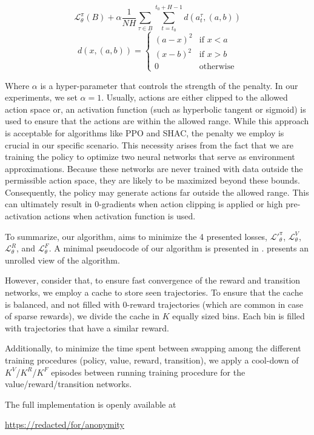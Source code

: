 $$\mathcal{L}_\theta^\pi(B) + \alpha \frac{1}{NH}\sum_{\tau\in B}\sum_{t=t_0}^{t_0+H-1} d(a_t^\tau,(a,b))$$
$$d(x,(a,b)) = \begin{cases}(a-x)^2 & \text{if } x < a \\ (x-b)^2 & \text{if } x > b \\ 0 & \text{otherwise} \end{cases}$$

    Where $\alpha$ is a hyper-parameter that controls the strength of the penalty. In our experiments, we set $\alpha=1$. Usually, actions are either clipped to the allowed action space or, an activation function (such as hyperbolic tangent or sigmoid) is used to ensure that the actions are within the allowed range. While this approach is acceptable for algorithms like PPO and SHAC, the penalty we employ is crucial in our specific scenario. This necessity arises from the fact that we are training the policy to optimize two neural networks that serve as environment approximations. Because these networks are never trained with data outside the permissible action space, they are likely to be maximized beyond these bounds. Consequently, the policy may generate actions far outside the allowed range. This can ultimately result in 0-gradients when action clipping is applied or high pre-activation actions when activation function is used. 

To summarize, our algorithm, aims to minimize the 4 presented losses, $\mathcal{L'}_\theta^{\pi}$, $\mathcal{L}_\theta^V$, $\mathcal{L}_\theta^R$, and $\mathcal{L}_\theta^F$. A minimal pseudocode of our algorithm is presented in .  presents an unrolled view of the \fname{} algorithm.



However, consider that, to ensure fast convergence of the reward and transition networks, we employ a cache to store seen trajectories. To ensure that the cache is balanced, and not filled with $0$-reward trajectories (which are common in case of sparse rewards), we divide the cache in $K$ equally sized bins. Each bin is filled with trajectories that have a similar reward. 

Additionally, to minimize the time spent between swapping among the different training procedures (policy, value, reward, transition), we apply a cool-down of $K^V$/$K^R$/$K^F$ episodes between running training procedure for the value/reward/transition networks. 

The full implementation is openly available at 
\begin{center}
\url{https://redacted/for/anonymity}
\end{center}




